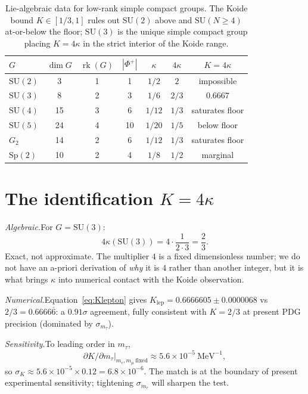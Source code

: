 \documentclass[aps,prl,reprint,amsmath,amssymb,nofootinbib,floatfix,superscriptaddress]{revtex4-2}
\newcommand{\rk}{\operatorname{rk}}
\newcommand{\SU}{\mathrm{SU}}
\newcommand{\Sp}{\mathrm{Sp}}
\newcommand{\Phiroots}{\Phi^{+}}
\begin{document}
\begin{table}[h]
\centering
\begin{tabular}{lcccccc}
\toprule
$G$ & $\dim G$ & $\rk(G)$ & $|\Phiroots|$ & $\kappa$ & $4\kappa$ & $K = 4\kappa$ \\
\midrule
$\SU(2)$ & 3 & 1 & 1 & $1/2$ & $2$ & impossible \\
$\SU(3)$ & 8 & 2 & 3 & $1/6$ & $2/3$ & $0.6667$ \\
$\SU(4)$ & 15 & 3 & 6 & $1/12$ & $1/3$ & saturates floor \\
$\SU(5)$ & 24 & 4 & 10 & $1/20$ & $1/5$ & below floor \\
$G_2$ & 14 & 2 & 6 & $1/12$ & $1/3$ & saturates floor \\
$\Sp(2)$ & 10 & 2 & 4 & $1/8$ & $1/2$ & marginal \\
\bottomrule
\end{tabular}
\caption{Lie-algebraic data for low-rank simple compact groups. The Koide bound $K \in [1/3, 1]$ rules out $\SU(2)$ above and $\SU(N\ge 4)$ at-or-below the floor; $\SU(3)$ is the unique simple compact group placing $K = 4\kappa$ in the strict interior of the Koide range. \label{tab:lie}}
\end{table}

\section{The identification $K = 4\kappa$}
\label{sec:identification}

\textit{Algebraic.}\quad For $G = \SU(3)$:
\begin{equation*}
4\kappa(\SU(3)) = 4 \cdot \frac{1}{2 \cdot 3} = \frac{2}{3}.
\end{equation*}
Exact, not approximate. The multiplier $4$ is a fixed dimensionless number; we do not have an a-priori derivation of \emph{why} it is $4$ rather than another integer, but it is what brings $\kappa$ into numerical contact with the Koide observation.

\textit{Numerical.}\quad Equation~\eqref{eq:Klepton} gives $K_{\mathrm{lep}} = 0.6666605 \pm 0.0000068$ vs $2/3 = 0.6666\overline{6}$: a $0.91\sigma$ agreement, fully consistent with $K = 2/3$ at present PDG precision (dominated by $\sigma_{m_\tau}$).

\textit{Sensitivity.}\quad To leading order in $m_\tau$,
\begin{equation*}
\left.\partial K / \partial m_\tau\right|_{m_e, m_\mu \mathrm{\ fixed}}
\approx 5.6 \times 10^{-5}~\mathrm{MeV}^{-1},
\end{equation*}
so $\sigma_K \approx 5.6 \times 10^{-5} \times 0.12 = 6.8 \times 10^{-6}$. The match is at the boundary of present experimental sensitivity; tightening $\sigma_{m_\tau}$ will sharpen the test.
\end{document}

